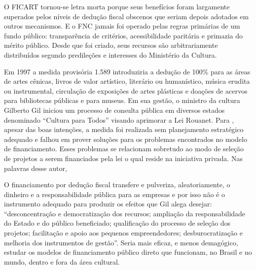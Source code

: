\documentclass[a4paper, 12pt, openright, oneside, german, french, english, brazil]{abntex2}
\begin{document}
	\begin{citacao}
		O FICART tornou-se letra morta porque seus benefícios foram largamente superados pelos níveis de dedução fiscal obscenos que seriam depois adotados em outros mecanismos. E o FNC jamais foi operado pelas regras primárias de um fundo público: transparência de critérios, acessibilidade paritária e primazia do mérito público. Desde que foi criado, seus recursos são arbitrariamente
		distribuídos segundo predileções e interesses do Ministério da Cultura. \cite[p. 22-3]{sarkovas2005incentivo}
	\end{citacao}
	
	Em 1997 a medida provisória 1.589 introduziria a dedução de 100\% para as áreas de artes cênicas,
	livros de valor artístico, literário ou humanístico, música erudita ou instrumental, circulação de
	exposições de artes plásticas e doações de acervos para bibliotecas públicas e para museus. Em sua gestão, o ministro da cultura Gilberto Gil iniciou um processo de consulta pública em diversos estados denominado ``Cultura para Todos'' visando aprimorar a Lei Rouanet. Para , apesar das boas intenções, a medida foi realizada sem planejamento estratégico adequado e falhou em prover soluções para os problemas encontrados no modelo de financiamento. Esses problemas se relacionam sobretudo ao modo de seleção de projetos a serem financiados pela lei o qual reside na iniciativa privada. Nas palavras desse autor, 
	
	\begin{citacao}
		O financiamento por dedução fiscal transfere e pulveriza, aleatoriamente, o dinheiro e a responsabilidade pública para as empresas e por	isso não é o instrumento adequado para produzir os efeitos que Gil alega desejar: ``desconcentração e democratização dos
		recursos; ampliação da responsabilidade do Estado e do público beneficiado; qualificação do processo de seleção dos projetos; facilitação e	apoio aos pequenos empreendedores; desburocratização e melhoria dos instrumentos de gestão”. Seria mais eficaz, e menos demagógico, estudar os modelos de financiamento público	direto que funcionam, no Brasil e no mundo,	dentro e fora da área cultural. \cite[p. 25]{sarkovas2005incentivo}
	\end{citacao}
	
\end{document}
